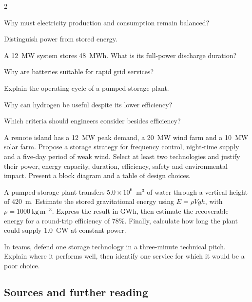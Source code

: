 \begin{multicols}{2}
\begin{questions}
\item Why must electricity production and consumption remain balanced?
\item Distinguish power from stored energy.
\item A 12~MW system stores 48~MWh. What is its full-power discharge duration?
\item Why are batteries suitable for rapid grid services?
\item Explain the operating cycle of a pumped-storage plant.
\item Why can hydrogen be useful despite its lower efficiency?
\item Which criteria should engineers consider besides efficiency?
\end{questions}

\begin{challenge}
A remote island has a 12~MW peak demand, a 20~MW wind farm and a 10~MW solar farm. Propose a storage strategy for frequency control, night-time supply and a five-day period of weak wind. Select at least two technologies and justify their power, energy capacity, duration, efficiency, safety and environmental impact. Present a block diagram and a table of design choices.
\end{challenge}

\begin{applicationexercise}
A pumped-storage plant transfers $5.0\times10^6$~m$^3$ of water through a vertical height of 420~m. Estimate the stored gravitational energy using $E=\rho Vgh$, with $\rho=1000~\mathrm{kg\,m^{-3}}$. Express the result in GWh, then estimate the recoverable energy for a round-trip efficiency of 78\%. Finally, calculate how long the plant could supply 1.0~GW at constant power.
\end{applicationexercise}

\begin{speaking}
In teams, defend one storage technology in a three-minute technical pitch. Explain where it performs well, then identify one service for which it would be a poor choice.
\end{speaking}

\end{multicols}

\subsection*{Sources and further reading}
\quad
{}
